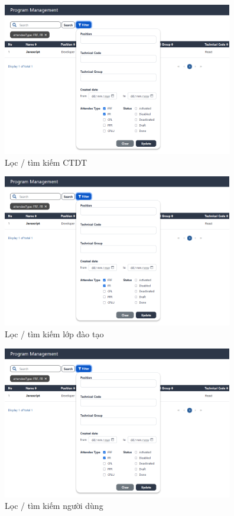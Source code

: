 \documentclass[report.tex]{subfiles}
\begin{document}
\begin{figure}[!htb]
{\centering
\includegraphics[width=380px]{../meta/ui.program-filter.png}
\caption{Lọc / tìm kiếm CTDT}
\par
}
\end{figure}
\FloatBarrier

\begin{figure}[!htb]
{\centering
\includegraphics[width=380px]{../meta/ui.program-filter.png}
\caption{Lọc / tìm kiếm lớp đào tạo}
\par
}
\end{figure}
\FloatBarrier

\begin{figure}[!htb]
{\centering
\includegraphics[width=380px]{../meta/ui.program-filter.png}
\caption{Lọc / tìm kiếm người dùng}
\par
}
\end{figure}
\FloatBarrier
\end{document}
